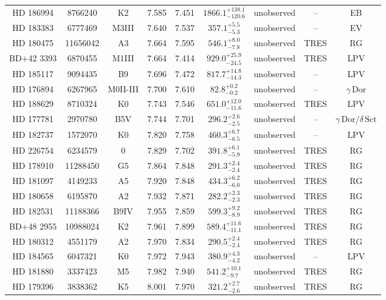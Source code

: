 \begin{table*}
\begin{tabular}{ccccccccc}
HD 186994 & 8766240 & K2 & 7.585 & 7.451 & $1866.1^{+138.1}_{-120.6}$ & unobserved & -- & EB \\
HD 183383 & 6777469 & M3III & 7.640 & 7.537 & $357.1^{+5.5}_{-5.3}$ & unobserved & -- & EV \\
HD 180475 & 11656042 & A3 & 7.664 & 7.595 & $546.1^{+8.0}_{-7.8}$ & unobserved & TRES & RG \\
BD+42 3393 & 6870455 & M1III & 7.664 & 7.414 & $929.0^{+25.9}_{-24.5}$ & unobserved & TRES & LPV \\
HD 185117 & 9094435 & B9 & 7.696 & 7.472 & $817.7^{+14.8}_{-14.3}$ & unobserved & -- & LPV \\
HD 176894 & 6267965 & M0II-III & 7.700 & 7.610 & $82.8^{+0.2}_{-0.2}$ & unobserved & -- & $\gamma\,\text{Dor}$ \\
HD 188629 & 8710324 & K0 & 7.743 & 7.546 & $651.0^{+12.0}_{-11.6}$ & unobserved & TRES & LPV \\
HD 177781 & 2970780 & B5V & 7.744 & 7.701 & $296.2^{+2.6}_{-2.5}$ & unobserved & -- & $\gamma\,\text{Dor} /\delta\,\text{Sct}$ \\
HD 182737 & 1572070 & K0 & 7.820 & 7.758 & $460.3^{+6.7}_{-6.5}$ & unobserved & -- & LPV \\
HD 226754 & 6234579 & 0 & 7.829 & 7.702 & $391.8^{+6.1}_{-5.9}$ & unobserved & TRES & RG \\
HD 178910 & 11288450 & G5 & 7.864 & 7.848 & $291.3^{+2.4}_{-2.4}$ & unobserved & TRES & RG \\
HD 181097 & 4149233 & A5 & 7.920 & 7.848 & $434.3^{+6.2}_{-6.0}$ & unobserved & TRES & RG \\
HD 180658 & 6195870 & A2 & 7.932 & 7.871 & $282.2^{+2.3}_{-2.3}$ & unobserved & TRES & RG \\
HD 182531 & 11188366 & B9IV & 7.955 & 7.859 & $599.3^{+9.2}_{-8.9}$ & unobserved & TRES & RG \\
BD+48 2955 & 10988024 & K2 & 7.961 & 7.899 & $589.4^{+11.6}_{-11.1}$ & unobserved & TRES & RG \\
HD 180312 & 4551179 & A2 & 7.970 & 7.834 & $290.5^{+2.4}_{-2.4}$ & unobserved & TRES & RG \\
HD 184565 & 6047321 & K0 & 7.972 & 7.943 & $380.9^{+4.3}_{-4.2}$ & unobserved & -- & LPV \\
HD 181880 & 3337423 & M5 & 7.982 & 7.940 & $541.2^{+10.1}_{-9.7}$ & unobserved & TRES & RG \\
HD 179396 & 3838362 & K5 & 8.001 & 7.970 & $321.2^{+2.7}_{-2.6}$ & unobserved & TRES & RG \\

\end{tabular}
\end{table*}
